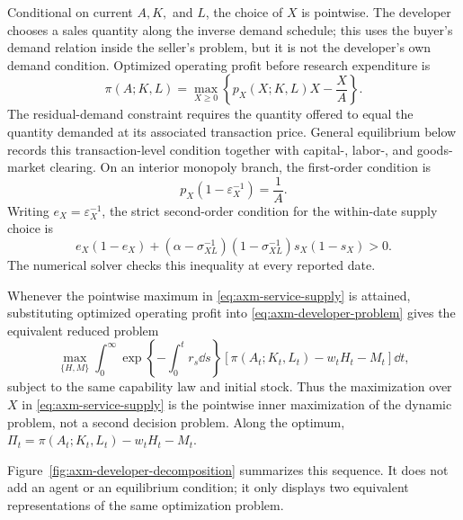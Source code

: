 Conditional on current \(A,K,\) and \(L\), the choice of \(X\) is pointwise.
The developer chooses a sales quantity along the inverse demand schedule; this
uses the buyer's demand relation inside the seller's problem, but it is not the
developer's own demand condition. Optimized operating profit before research
expenditure is
\begin{equation}
 \pi(A;K,L)=\max_{X\geq0}
 \left\{p_X(X;K,L)X-\frac{X}{A}\right\}.
 \label{eq:axm-service-supply}
\end{equation}
The residual-demand constraint requires the quantity offered to equal the
quantity demanded at its associated transaction price. General equilibrium
below records this transaction-level condition together with capital-, labor-,
and goods-market clearing. On an interior monopoly branch, the first-order
condition is
\begin{equation}
 p_X(1-\varepsilon_X^{-1})=\frac{1}{A}.
 \label{eq:axm-monopoly-foc}
\end{equation}
Writing \(e_X=\varepsilon_X^{-1}\), the strict second-order condition for the
within-date supply choice is
\begin{equation}
 e_X(1-e_X)
 +(\alpha-\sigma_{XL}^{-1})(1-\sigma_{XL}^{-1})s_X(1-s_X)>0.
 \label{eq:axm-monopoly-soc}
\end{equation}
The numerical solver checks this inequality at every reported date.

Whenever the pointwise maximum in \eqref{eq:axm-service-supply} is attained,
substituting optimized operating profit into
\eqref{eq:axm-developer-problem} gives the equivalent reduced problem
\begin{equation}
 \max_{\{H,M\}}
 \int_0^\infty
 \exp\left\{-\int_0^t r_s\dd s\right\}
 \left[\pi(A_t;K_t,L_t)-w_tH_t-M_t\right]\dd t,
 \label{eq:axm-developer-problem-reduced}
\end{equation}
subject to the same capability law and initial stock. Thus the maximization over
\(X\) in \eqref{eq:axm-service-supply} is the pointwise inner maximization of
the dynamic problem, not a second decision problem. Along the optimum,
\(\Pi_t=\pi(A_t;K_t,L_t)-w_tH_t-M_t\).

Figure~\ref{fig:axm-developer-decomposition} summarizes this sequence. It does
not add an agent or an equilibrium condition; it only displays two equivalent
representations of the same optimization problem.

